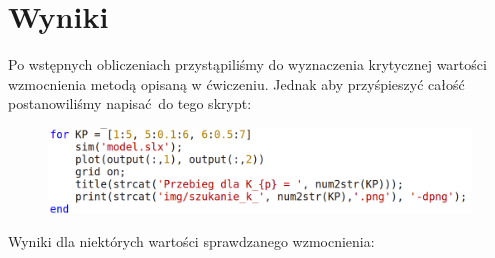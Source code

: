 \documentclass[a4paper, 12pt]{article}
\begin{document}
	\section{Wyniki}
		Po wstępnych obliczeniach przystąpiliśmy do wyznaczenia krytycznej wartości wzmocnienia metodą opisaną w ćwiczeniu. Jednak aby przyśpieszyć całość postanowiliśmy napisać do tego skrypt:
		\begin{figure}[H]
			\includegraphics[width = \textwidth]{./code/desperate.png}
		\end{figure}
		\noindent
		Wyniki dla niektórych wartości sprawdzanego wzmocnienia:
\end{document}
